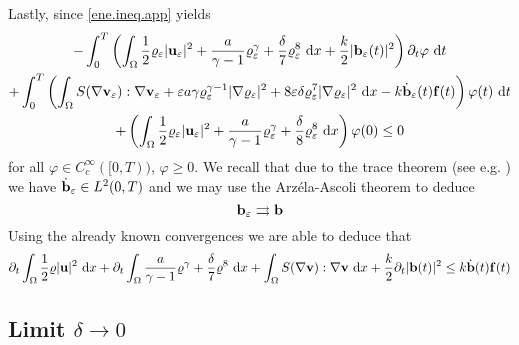 \documentclass{article}
\newcommand{\bb}{{\bf b}}
\newcommand{\vb}{\bb}
\newcommand{\vf}{{\bf f}}
\newcommand{\bu}{{\bf u}}
\newcommand{\vu}{\bu}
\newcommand{\bv}{{\bf v}}
\newcommand{\vv}{\bv}
\newcommand{\pat}{\partial_t}
\numberwithin{equation}{section}
\begin{document}
Lastly, since \eqref{ene.ineq.app} yields
\begin{multline*}
-\int_0^T \left(\int_\Omega\frac 12 \varrho_\varepsilon |\vu_\varepsilon|^2 + \frac a{\gamma-1}\varrho_\varepsilon^\gamma + \frac \delta 7 \varrho_\varepsilon^8\ {\rm d}x + \frac k2 |\vb_\varepsilon(t)|^2\right) \pat \varphi\ {\rm d}t\\
 + \int_0^T \left(\int_\Omega S(\nabla 
\vv_\varepsilon):\nabla\vv_\varepsilon + \varepsilon a \gamma \varrho_\varepsilon^{\gamma-1}|\nabla\varrho_\varepsilon|^2 + 8\varepsilon\delta\varrho_\varepsilon^7|\nabla\varrho_\varepsilon|^2\ {\rm d}x - k\dot\vb_\varepsilon(t)\vf(t)\right) \varphi(t)\ {\rm d}t\\
 + \left(\int_\Omega \frac 12 \varrho_\varepsilon |\vu_\varepsilon|^2 + \frac a{\gamma-1}\varrho_\varepsilon^\gamma + \frac\delta8\varrho_\varepsilon^8\ {\rm d}x\right)\varphi(0)\leq 0
\end{multline*}
for all $\varphi\in C^\infty_c([0,T))$, $\varphi\geq 0$. We recall that due to the trace theorem (see e.g. \cite[Theorem 5.36]{AdFo}) we have
$\dot \vb_\varepsilon\in L^2(0,T)$ and we may use the Arz\'ela-Ascoli theorem to deduce 
$$\vb_\varepsilon \rightrightarrows \vb$$
Using the already known convergences we are able to deduce that
\begin{equation}\label{ene.po.eps}
\pat \int_\Omega \frac 12 \varrho|\vu|^2\ {\rm d}x + \pat \int_\Omega \frac a{\gamma-1}\varrho^\gamma + \frac \delta 7 \varrho^8\ {\rm d}x + \int_\Omega S(\nabla\vv):\nabla \vv\ {\rm d}x + \frac k2 \pat |\vb(t)|^2\leq k\dot\vb(t)\vf(t)
\end{equation}

\subsection{Limit $\delta\to 0$}
\end{document}
